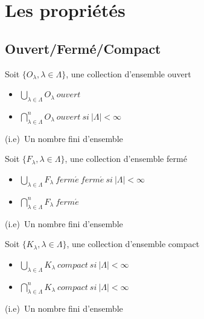 \section{Les propriétés}
	\subsection*{Ouvert/Fermé/Compact}
	\begin{myprop}
		Soit $\{O_{\lambda},\lambda\in\Lambda\}$, une collection d'ensemble ouvert
		\begin{itemize}
			\item $\bigcup\limits_{\lambda\in\Lambda}O_{\lambda}~ouvert$
			\item $\bigcap\limits^{n}_{\lambda\in\Lambda}O_{\lambda}~ouvert~si~|\Lambda|<\infty$
		\end{itemize}
	(i.e)~Un nombre fini d'ensemble
	\end{myprop}
	\begin{myprop}
		Soit $\{F_{\lambda},\lambda\in\Lambda\}$, une collection d'ensemble fermé
		\begin{itemize}
			\item $\bigcup\limits_{\lambda\in\Lambda}F_{\lambda}~ferm\acute{e}~ferm\acute{e}~si~|\Lambda|<\infty$
			\item $\bigcap\limits^{n}_{\lambda\in\Lambda}F_{\lambda}~ferm\acute{e}$
		\end{itemize}
		(i.e)~Un nombre fini d'ensemble
	\end{myprop}
	\begin{myprop}
		Soit $\{K_{\lambda},\lambda\in\Lambda\}$, une collection d'ensemble compact
		\begin{itemize}
			\item $\bigcup\limits_{\lambda\in\Lambda}K_{\lambda}~compact~si~|\Lambda|<\infty$
			\item $\bigcap\limits^{n}_{\lambda\in\Lambda}K_{\lambda}~compact~si~|\Lambda|<\infty$
		\end{itemize}
		(i.e)~Un nombre fini d'ensemble
	\end{myprop}

